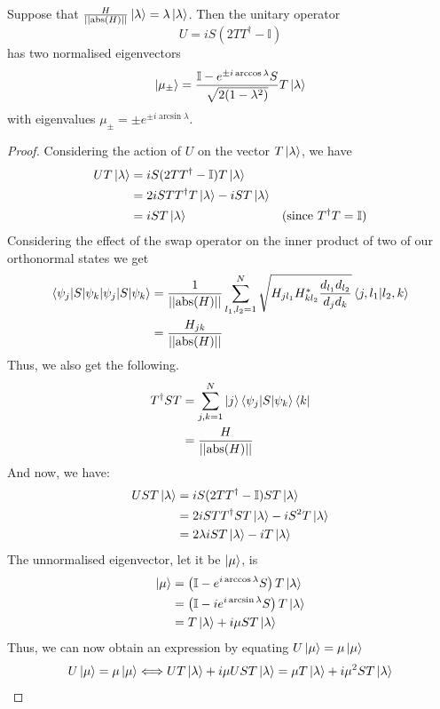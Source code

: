 \documentclass[
10pt, %
a4paper, %
oneside, %
headinclude,footinclude, %
BCOR5mm, %
]{scrartcl}
\begin{document}
\begin{theorem}
Suppose that $\frac{H}{||\text{abs}(H)||}\ket\lambda=\lambda\ket\lambda$. Then the unitary operator
$$U=iS(2TT^{\dagger}-\mathbb{I})$$
has two normalised eigenvectors
$$\ket{\mu_{\pm}}=\frac{\mathbb{I}-e^{\pm i\arccos\lambda}S}{\sqrt{2(1-\lambda^2)}}T\ket\lambda$$
with eigenvalues $\mu_{\pm}=\pm e^{\pm i\arcsin\lambda}$.
\end{theorem}
\begin{proof}
Considering the action of $U$ on the vector $T\ket\lambda$, we have
\begin{align*}
UT\ket\lambda&=iS(2TT^{\dagger}-\mathbb{I})T\ket\lambda\\
&=2iSTT^{\dagger}T\ket\lambda-iST\ket\lambda\\
&=iST\ket\lambda&(\text{since }T^{\dagger}T=\mathbb{I})
\end{align*}
Considering the effect of the swap operator on the inner product of two of our orthonormal states we get
\begin{align*}
\braket{\psi_j|S|\psi_k}&=\frac{1}{||\text{abs}(H)||}\sum_{l_1,l_2=1}^N\sqrt{H_{jl_1}H_{kl_2}^*\frac{d_{l_1}d_{l_2}}{d_jd_k}}\braket{j,l_1}{l_2,k}\\
&=\frac{H_{jk}}{||\text{abs}(H)||}
\end{align*}
Thus, we also get the following.
\begin{align*}
T^{\dagger}ST&=\sum_{j,k=1}^N\ket j\left<\psi_j|S|\psi_k\right>\bra k\\
&=\frac{H}{||\text{abs}(H)||}
\end{align*}
And now, we have:
\begin{align*}
UST\ket\lambda&=iS(2TT^{\dagger}-\mathbb{I})ST\ket\lambda\\
&=2iSTT^{\dagger}ST\ket\lambda-iS^2T\ket\lambda\\
&=2\lambda iST\ket\lambda-iT\ket\lambda
\end{align*}
The unnormalised eigenvector, let it be $\ket\mu$, is
\begin{align*}
\ket\mu&=\left(\mathbb{I}-e^{i\arccos\lambda}S\right)T\ket\lambda\\
&=\left(\mathbb{I}-ie^{i\arcsin\lambda}S\right)T\ket\lambda\\
&=T\ket\lambda+i\mu ST\ket\lambda
\end{align*}
Thus, we can now obtain an expression by equating $U\ket\mu=\mu\ket\mu$
\begin{align*}
U\ket\mu=\mu\ket\mu&\Longleftrightarrow UT\ket\lambda+i\mu UST\ket\lambda=\mu T\ket\lambda+i\mu^2ST\ket\lambda\\

\end{align*}
\end{proof}
\end{document}
